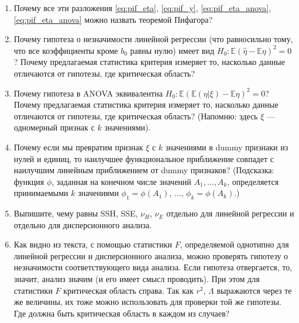 \documentclass[12 pt]{article}
\def\E{\mathbb{E}}
\begin{document}
\begin{enumerate}
\item
Почему все эти разложения \eqref{eq:pif_eta}, \eqref{eq:pif_y}, \eqref{eq:pif_eta_anova}, \eqref{eq:pif_eta_anova} можно назвать теоремой Пифагора?
\item
Почему гипотеза о незначимости линейной регрессии (что равносильно тому, что все коэффициенты кроме $b_0$ равны нулю)
имеет вид $H_0: \E(\hat\eta - \E\eta)^2 = 0$? Почему предлагаемая статистика критерия измеряет то, насколько данные отличаются
от гипотезы, где критическая область?
\item
Почему гипотеза в ANOVA эквивалентна $H_0: \E(\E(\eta|\xi) - \E\eta)^2 = 0$? Почему предлагаемая статистика критерия измеряет то, насколько данные отличаются от гипотезы, где критическая область? (Напомню: здесь $\xi$ --- одномерный признак с $k$ значениями).
\item
Почему если мы превратим признак $\xi$ с $k$ значениями в dummy признаки из нулей и единиц, то
наилучшее функциональное приближение совпадет с наилучшим линейным приближением от dummy признаков?
(Подсказка: функция $\phi$, заданная на конечном числе значений $A_1,\ldots,A_k$, определяется принимаемыми $k$
значениями  $\phi_1=\phi(A_1)$, ..., $\phi_k=\phi(A_k)$.)
\item
Выпишите, чему равны SSH, SSE, $\nu_H$, $\nu_E$ отдельно для линейной регрессии и отдельно для дисперсионного анализа.
\item
Как видно из текста,  с помощью статистики $F$, определяемой однотипно для линейной регрессии и дисперсионного анализа,
можно проверять гипотезу о незначимости соответствующего вида анализа. Если гипотеза отвергается, то, значит,
анализ значим (и его имеет смысл проводить). При этом для статистики $F$ критическая область справа.
Так как $r^2$, $\Lambda$ выражаются через те же величины, их тоже можно использовать
для проверки той же гипотезы. Где должна быть критическая область в каждом из
случаев?
\end{enumerate}
\end{document}
